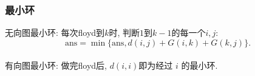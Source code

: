 \subsubsection{最小环}
\noindent
无向图最小环: 每次floyd到$k$时, 判断$1$到$k-1$的每一个$i,j$:
$$\mathrm{ans} = \min\{\mathrm{ans}, d(i,j)+G(i,k)+G(k,j)\}.$$\\
\noindent
有向图最小环: 做完floyd后, $d(i,i)$即为经过 $i$ 的最小环.